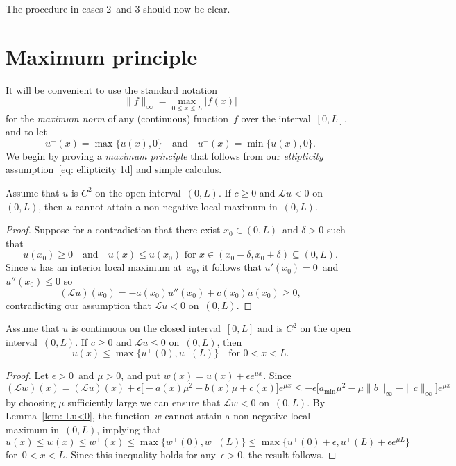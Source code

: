 The procedure in cases 2~and 3 should now be clear.

\section{Maximum principle}
It will be convenient to use the standard notation
\[
\|f\|_\infty=\max_{0\le x\le L}|f(x)|
\]
for the \emph{maximum norm} of any (continuous) function~$f$ over 
the interval~$[0,L]$, and to let
\[
u^+(x)=\max\{u(x),0\}
\quad\text{and}\quad
u^-(x)=\min\{u(x),0\}.  
\]
We begin by proving a \emph{maximum principle} that 
follows from our \emph{ellipticity} assumption~\eqref{eq: ellipticity 1d} and 
simple calculus.

\begin{lemma}\label{lem: Lu<0}
Assume that $u$ is $C^2$ on the open interval~$(0,L)$.
If $c\ge0$ and $\mathcal{L}u<0$ on~$(0,L)$, then $u$ cannot attain a 
non-negative local maximum in~$(0,L)$.
\end{lemma}
\begin{proof}
Suppose for a contradiction that there exist $x_0\in(0,L)$~and $\delta>0$ such
that
\[
u(x_0)\ge0\quad\text{and}\quad
\text{$u(x)\le u(x_0)$ for~$x\in(x_0-\delta,x_0+\delta)\subseteq(0,L)$.}
\]
Since $u$ has an interior local maximum at~$x_0$, it follows that 
$u'(x_0)=0$~and $u''(x_0)\le0$ so 
\[
(\mathcal{L}u)(x_0)=-a(x_0)u''(x_0)+c(x_0)u(x_0)\ge 0,
\]
contradicting our assumption that $\mathcal{L}u<0$ on~$(0,L)$.
\end{proof}

\begin{theorem}\label{thm: max principle 1d}
Assume that $u$ is continuous on the closed interval~$[0,L]$ and is $C^2$ on 
the open interval~$(0,L)$. If $c\ge0$ and $\mathcal{L}u\le0$ on~$(0,L)$, then
\[
u(x)\le\max\{u^+(0),u^+(L)\}\quad\text{for $0<x<L$.}
\]
\end{theorem}
\begin{proof}
Let $\epsilon>0$~and $\mu>0$, and put $w(x)=u(x)+\epsilon e^{\mu x}$.  Since
\[
(\mathcal{L}w)(x)
	=(\mathcal{L}u)(x)+\epsilon\bigl[-a(x)\mu^2+b(x)\mu+c(x)\bigr]e^{\mu x}
\le-\epsilon\bigl[a_{\min}\mu^2-\mu\|b\|_\infty-\|c\|_\infty\bigr]e^{\mu x}
\]
by choosing $\mu$ sufficiently large we can ensure that $\mathcal{L}w<0$
on~$(0,L)$.  By Lemma~\ref{lem: Lu<0}, the function~$w$ cannot attain a 
non-negative local maximum in~$(0,L)$, implying that 
\[
u(x)\le w(x)\le w^+(x)\le\max\{w^+(0),w^+(L)\}
	\le\max\{u^+(0)+\epsilon,u^+(L)+\epsilon e^{\mu L}\}
\]
for~$0<x<L$.  Since this inequality holds for any~$\epsilon>0$, the result 
follows.
\end{proof}

